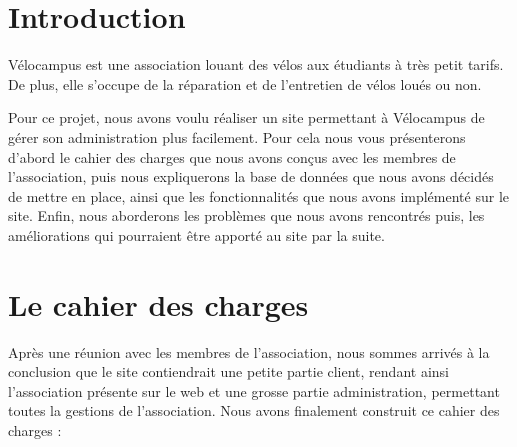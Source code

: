 \documentclass[11pt,a4paper,titlepage]{report}
\begin{document}
\tableofcontents
\chapter*{Introduction}
Vélocampus est une association louant des vélos aux étudiants à très petit tarifs. De plus, elle s’occupe de la réparation et de l'entretien de vélos loués ou non.

Pour ce projet, nous avons voulu réaliser un site permettant à Vélocampus de gérer son administration plus facilement. Pour cela nous vous présenterons d'abord le cahier des charges que nous avons conçus avec les membres de l'association, puis nous expliquerons la base de données que nous avons décidés de mettre en place, ainsi que les fonctionnalités que nous avons implémenté sur le site. Enfin, nous aborderons les problèmes que nous avons rencontrés puis, les améliorations qui pourraient être apporté au site par la suite.


\chapter{Le cahier des charges}
Après une réunion avec les membres de l'association, nous sommes arrivés à la conclusion que le site contiendrait une petite partie client, rendant ainsi l'association présente sur le web et une grosse partie administration, permettant toutes la gestions de l'association. 
Nous avons finalement construit ce cahier des charges :\\
\end{document}
